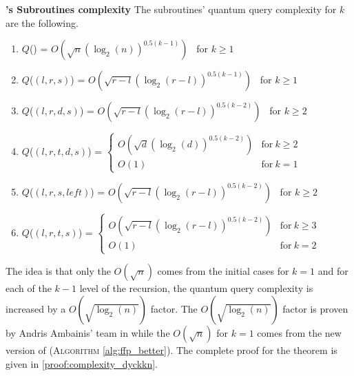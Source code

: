 \begin{theorem}{\textbf{'s Subroutines complexity}} \label{th:subroutine_complexity}
    The subroutines' quantum query complexity for $k$ are the following.
    \begin{enumerate}
        \item $Q$() = $O\left(\sqrt{n}(\log_2(n))^{0.5(k-1)}\right)$ \ for $k \geq 1$
        \item $Q$($(l,r,s)$) = $O\left(\sqrt{r-l}(\log_2(r-l))^{0.5(k-1)}\right)$ \ for $k \geq 1$
        \item $Q$($(l,r,d,s)$) = $O\left(\sqrt{r-l}(\log_2(r-l))^{0.5(k-2)}\right)$ \ for $k \geq 2$
        \item $Q$($(l, r, t, d, s)$) = $\left\{
                  \begin{array}{ll}
                      O\left(\sqrt{d}(\log_2(d))^{0.5(k-2)}\right) & \textrm{for} \ k \geq 2 \\
                      O(1)                                         & \textrm{for} \  k = 1
                  \end{array}
                  \right.$
        \item $Q$($(l,r,s, left)$) = $O\left(\sqrt{r-l}(\log_2(r-l))^{0.5(k-2)}\right)$ \ for $k \geq 2$
        \item $Q$($(l,r,t,s)$) = $\left\{ \begin{array}{ll}
                      O\left(\sqrt{r-l}(\log_2(r-l))^{0.5(k-2)}\right) & \textrm{for} \ k \geq 3 \\
                      O(1)                                             & \textrm{for} \ k = 2
                  \end{array}
                  \right.$
    \end{enumerate}
\end{theorem}

\begin{tproof}
    The idea is that only the $O\left(\sqrt{n}\right)$ comes from the initial cases for $k = 1$ and
    for each of the $k-1$ level of the recursion, the quantum query complexity is increased by
    a $O\left(\sqrt{\log_2(n)}\right)$ factor. The $O\left(\sqrt{\log_2(n)}\right)$ factor
    is proven by Andris Ambainis' team in \cite{art:2DGrid} while the $O\left(\sqrt{n}\right)$
    for $k = 1$ comes from the new version of  (\textsc{Algorithm} \autoref{alg:ffp_better}).
    The complete proof for the theorem is given in \autoref{proof:complexity_dyckkn}.
\end{tproof}

